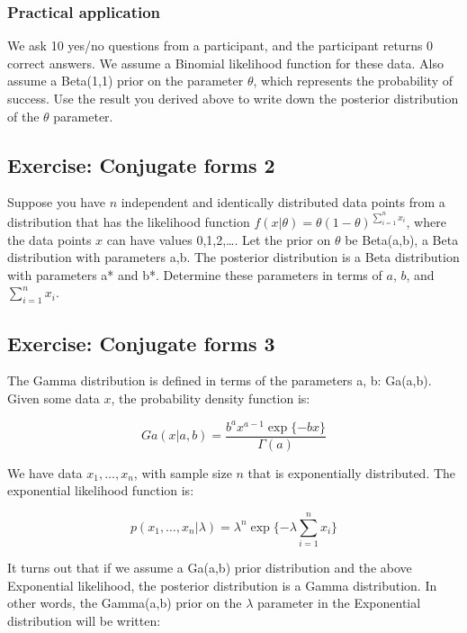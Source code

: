 \documentclass[12pt,]{krantz}
\theoremstyle{definition}
\theoremstyle{definition}
\theoremstyle{definition}
\theoremstyle{remark}
\begin{document}
\subsubsection{Practical application}\label{practical-application}

We ask 10 yes/no questions from a participant, and the participant
returns 0 correct answers. We assume a Binomial likelihood function for
these data. Also assume a Beta(1,1) prior on the parameter \(\theta\),
which represents the probability of success. Use the result you derived
above to write down the posterior distribution of the \(\theta\)
parameter.

\subsection{Exercise: Conjugate forms
2}\label{exercise-conjugate-forms-2}

Suppose you have \(n\) independent and identically distributed data
points from a distribution that has the likelihood function
\(f(x|\theta)=\theta(1-\theta)^{\sum_{i=1}^n x_i}\), where the data
points \(x\) can have values 0,1,2,\dots. Let the prior on \(\theta\) be
Beta(a,b), a Beta distribution with parameters a,b. The posterior
distribution is a Beta distribution with parameters a* and b*. Determine
these parameters in terms of \(a\), \(b\), and \(\sum_{i=1}^n x_i\).

\subsection{Exercise: Conjugate forms
3}\label{exercise-conjugate-forms-3}

The Gamma distribution is defined in terms of the parameters a, b:
Ga(a,b). Given some data \(x\), the probability density function is:

\begin{equation}
Ga(x | a,b)=\frac{b^a x^{a-1} \exp\{-bx\}}{\Gamma(a)}
\end{equation}

We have data \(x_1,\dots, x_n\), with sample size \(n\) that is
exponentially distributed. The exponential likelihood function is:

\begin{equation}
p(x_1,\dots,x_n | \lambda)=\lambda^n \exp \{-\lambda \sum_{i=1}^n x_i \}
\end{equation}

It turns out that if we assume a Ga(a,b) prior distribution and the
above Exponential likelihood, the posterior distribution is a Gamma
distribution. In other words, the Gamma(a,b) prior on the \(\lambda\)
parameter in the Exponential distribution will be written:
\end{document}
